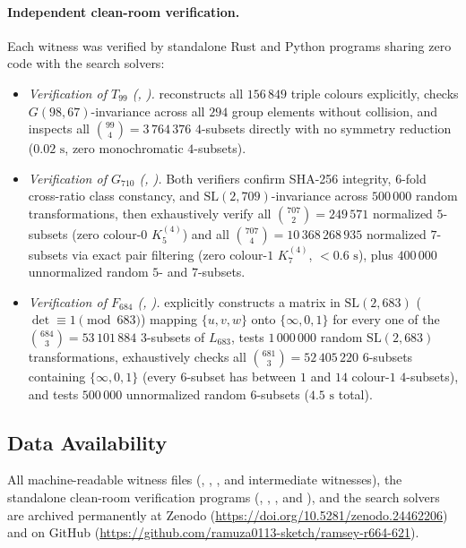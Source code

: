 \documentclass[11pt]{article}
\theoremstyle{remark}
\begin{document}
\paragraph{Independent clean-room verification.}
Each witness was verified by standalone Rust and Python programs sharing zero
code with the search solvers:
\begin{itemize}
\item \emph{Verification of $T_{99}$ (, ).}
   reconstructs all $156\,849$ triple colours explicitly,
  checks $G(98,67)$-invariance across all $294$ group elements without
  collision, and inspects all $\binom{99}{4}=3\,764\,376$ $4$-subsets directly
  with no symmetry reduction ($0.02\text{ s}$, zero monochromatic $4$-subsets).
\item \emph{Verification of $G_{710}$ (, ).}
  Both verifiers confirm SHA-256 integrity, $6$-fold cross-ratio class
  constancy, and $\mathrm{SL}(2,709)$-invariance across $500\,000$ random
  transformations, then exhaustively verify all $\binom{707}{2}=249\,571$
  normalized $5$-subsets (zero colour-$0$ $K_5^{(4)}$) and all
  $\binom{707}{4}=10\,368\,268\,935$ normalized $7$-subsets via exact pair
  filtering (zero colour-$1$ $K_7^{(4)}$, $<0.6\text{ s}$), plus $400\,000$
  unnormalized random $5$- and $7$-subsets.
\item \emph{Verification of $F_{684}$ (, ).}
   explicitly constructs a matrix in
  $\mathrm{SL}(2,683)$ ($\det\equiv 1\pmod{683}$) mapping $\{u,v,w\}$ onto
  $\{\infty,0,1\}$ for every one of the $\binom{684}{3}=53\,101\,884$
  $3$-subsets of $L_{683}$, tests $1\,000\,000$ random $\mathrm{SL}(2,683)$
  transformations, exhaustively checks all $\binom{681}{3}=52\,405\,220$
  $6$-subsets containing $\{\infty,0,1\}$ (every $6$-subset has between $1$ and
  $14$ colour-$1$ $4$-subsets), and tests $500\,000$ unnormalized random
  $6$-subsets ($4.5\text{ s}$ total).
\end{itemize}

\subsection*{Data Availability}
{\sloppy
All machine-readable witness files (,
, , and
intermediate witnesses), the standalone clean-room verification programs
(, ,
, and ), and the search
solvers are archived permanently at Zenodo
(\url{https://doi.org/10.5281/zenodo.24462206}) and on GitHub
(\url{https://github.com/ramuza0113-sketch/ramsey-r664-621}).\par}
\end{document}
